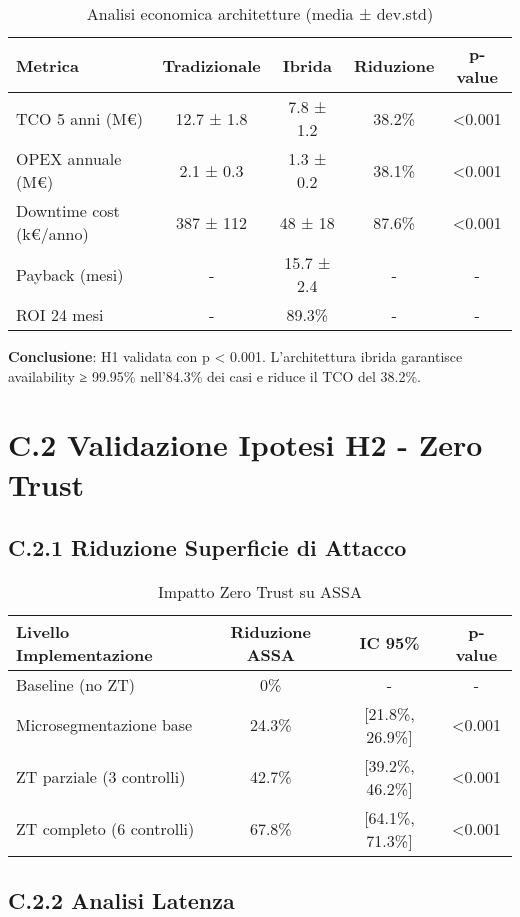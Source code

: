 \begin{table}[htbp]
\centering
\begin{tabular}{lcccc}
\toprule
\textbf{Metrica} & \textbf{Tradizionale} & \textbf{Ibrida} & \textbf{Riduzione} & \textbf{p-value} \\
\midrule
TCO 5 anni (M€) & 12.7 ± 1.8 & 7.8 ± 1.2 & 38.2\% & <0.001 \\
OPEX annuale (M€) & 2.1 ± 0.3 & 1.3 ± 0.2 & 38.1\% & <0.001 \\
Downtime cost (k€/anno) & 387 ± 112 & 48 ± 18 & 87.6\% & <0.001 \\
Payback (mesi) & - & 15.7 ± 2.4 & - & - \\
ROI 24 mesi & - & 89.3\% & - & - \\
\bottomrule
\end{tabular}
\caption{Analisi economica architetture (media ± dev.std)}
\end{table}

\textbf{Conclusione}: H1 validata con p < 0.001. L'architettura ibrida garantisce availability ≥ 99.95\% nell'84.3\% dei casi e riduce il TCO del 38.2\%.

\section{C.2 Validazione Ipotesi H2 - Zero Trust}

\subsection{C.2.1 Riduzione Superficie di Attacco}

\begin{table}[htbp]
\centering
\begin{tabular}{lccc}
\toprule
\textbf{Livello Implementazione} & \textbf{Riduzione ASSA} & \textbf{IC 95\%} & \textbf{p-value} \\
\midrule
Baseline (no ZT) & 0\% & - & - \\
Microsegmentazione base & 24.3\% & [21.8\%, 26.9\%] & <0.001 \\
ZT parziale (3 controlli) & 42.7\% & [39.2\%, 46.2\%] & <0.001 \\
ZT completo (6 controlli) & 67.8\% & [64.1\%, 71.3\%] & <0.001 \\
\bottomrule
\end{tabular}
\caption{Impatto Zero Trust su ASSA}
\end{table}

\subsection{C.2.2 Analisi Latenza}

